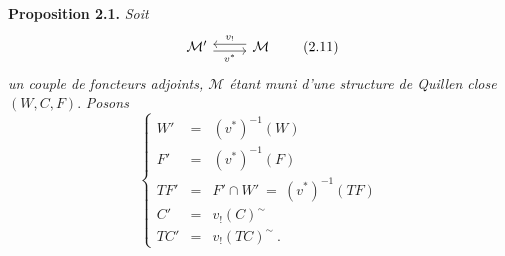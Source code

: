 \documentclass[11pt]{article}
\newcommand{\printedpage}[1]{\marginpar{\footnotesize p.~#1}}
\newcommand{\M}{\mathcal{M}}
\begin{document}
\printedpage{10}

\textbf{Proposition 2.1.} \textit{Soit}
\[
\begin{tikzcd}
\M' \arrow[r, shift right, "v^*"'] & \M \arrow[l, shift right, "v_!"']
\end{tikzcd}
\tag*{(2.11)} %
\]
\textit{un couple de foncteurs adjoints, $\M$ étant muni d'une structure de Quillen close} $(W,C,F)$. \textit{Posons}
\[
\left\{
\begin{array}{rcl}
W' & = & (v^*)^{-1}(W)\\
F' & = & (v^*)^{-1}(F)\\
TF' & = & F' \cap W' \ = \ (v^*)^{-1}(TF)\\
C' & = & v_!(C)^{\sim}\\
TC' & = & v_!(TC)^{\sim}\ .
\end{array}\right.
\tag*{(2.1.2)}
\]
\end{document}
